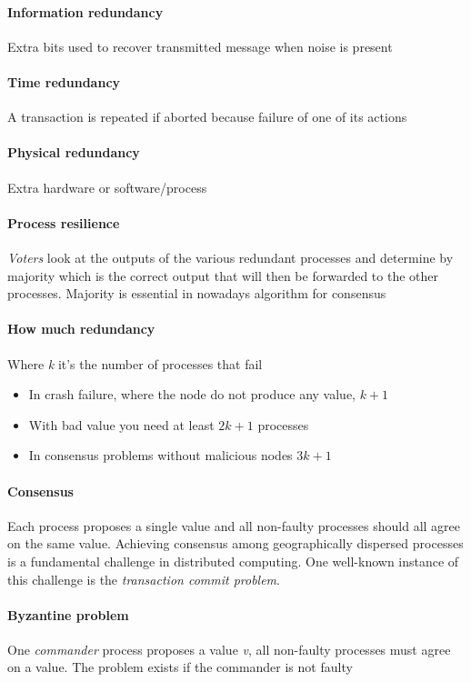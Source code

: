 \paragraph{Information redundancy} 
Extra bits used to recover transmitted message when noise is present

\paragraph{Time redundancy}
A transaction is repeated if aborted because failure of one of its actions

\paragraph{Physical redundancy}
Extra hardware or software/process

\paragraph{Process resilience}
\textit{Voters} look at the outputs of the various redundant processes and
determine by majority which is the correct output that will then be forwarded to the other processes. Majority is essential in nowadays algorithm for consensus

\paragraph{How much redundancy}
Where \textit{k} it’s the number of processes that fail
\begin{itemize}
    \item In crash failure, where the node do not produce any value, $k+1$
    \item With bad value you need at least $2k+1$ processes
    \item In consensus problems without malicious nodes $3k+1$
\end{itemize}

\paragraph{Consensus}
Each process proposes a single value and all non-faulty processes should all agree on the same value. Achieving consensus among geographically dispersed processes is a fundamental challenge in distributed computing. One well-known instance of this challenge is the \textit{transaction commit problem}.

\paragraph{Byzantine problem}
One \textit{commander} process proposes a value \textit{v}, all non-faulty processes must agree on a value. The problem exists if the commander is not faulty

